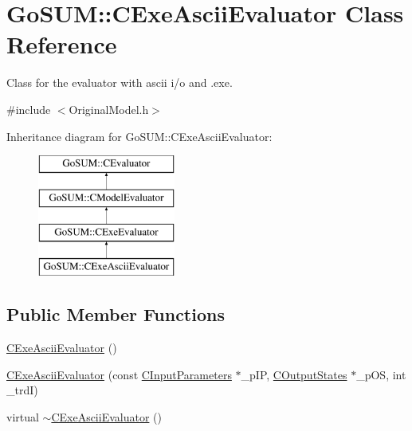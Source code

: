 \hypertarget{class_go_s_u_m_1_1_c_exe_ascii_evaluator}{\section{Go\-S\-U\-M\-:\-:C\-Exe\-Ascii\-Evaluator Class Reference}
\label{class_go_s_u_m_1_1_c_exe_ascii_evaluator}
}


Class for the evaluator with ascii i/o and .exe.  




{\ttfamily \#include $<$Original\-Model.\-h$>$}

Inheritance diagram for Go\-S\-U\-M\-:\-:C\-Exe\-Ascii\-Evaluator\-:\begin{figure}[H]
\begin{center}
\leavevmode
\includegraphics[height=4.000000cm]{class_go_s_u_m_1_1_c_exe_ascii_evaluator}
\end{center}
\end{figure}
\subsection*{Public Member Functions}
\begin{DoxyCompactItemize}
\item 
\hyperlink{class_go_s_u_m_1_1_c_exe_ascii_evaluator_aaf0d92f18ef702c15efd603d172ff1b9}{C\-Exe\-Ascii\-Evaluator} ()
\item 
\hyperlink{class_go_s_u_m_1_1_c_exe_ascii_evaluator_aeb20b18053aef9a95d6d3ecc15b11779}{C\-Exe\-Ascii\-Evaluator} (const \hyperlink{class_go_s_u_m_1_1_c_input_parameters}{C\-Input\-Parameters} $\ast$\-\_\-p\-I\-P, \hyperlink{class_go_s_u_m_1_1_c_output_states}{C\-Output\-States} $\ast$\-\_\-p\-O\-S, int \-\_\-trd\-I)
\item 
virtual \hyperlink{class_go_s_u_m_1_1_c_exe_ascii_evaluator_ac6292f4ae77f94e328d1ee2c16150378}{$\sim$\-C\-Exe\-Ascii\-Evaluator} ()
\end{DoxyCompactItemize}
